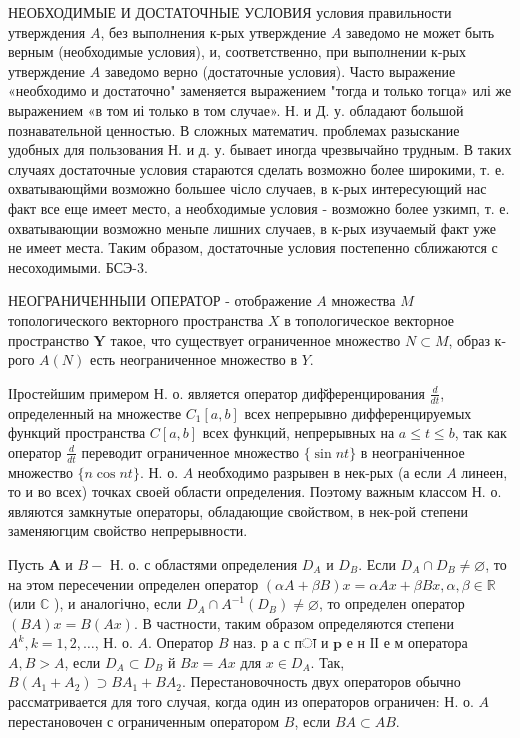 \documentclass[10pt]{article}
\begin{document}
НЕОБХОДИМЫЕ И ДОСТАТОЧНЫЕ УСЛОВИЯ условия правильности утверждения $A$, без выполнения к-рых утверждение $A$ заведомо не может быть верным (необходимые условия), и, соответственно, при выполнении к-рых утверждение $A$ заведомо верно (достаточные условия). Часто выражение «необходимо и достаточно" заменяется выражением "тогда и только тогца» илі же выражением «в том иі только в том случае». Н. и Д. у. обладают большой познавательной ценностью. В сложных математич. проблемах разыскание удобных для пользования Н. и д. у. бывает иногда чрезвычайно трудным. В таких случаях достаточные условия стараются сделать возможно более широкими, т. е. охватывающйми возможно большее чісло случаев, в к-рых интересующий нас факт все еще имеет место, а необходимые условия - возможно более узкимп, т. е. охватывающии возможно меньпе лишних случаев, в к-рых изучаемый факт уже не имеет места. Таким образом, достаточные условия постепенно сближаются с несоходимыми. БСЭ-3.



НЕОГРАНИЧЕННЫІИ ОПЕРАТОР - отображение $A$ множества $M$ топологического векторного пространства $X$ в топологическое векторное пространство $\boldsymbol{Y}$ такое, что существует ограниченное множество $N \subset M$, образ к-рого $A(N)$ есть неограниченное множество в $Y$.



ІІростейшим примером Н. о. является оператор диф̆ференцирования $\frac{d}{d t}$, определенный на множестве $C_{1}[a, b]$ всех непрерывно дифференцируемых функций пространства $C[a, b]$ всех функций, непрерывных на $a \leqslant t \leqslant b$, так как оператор $\frac{d}{d t}$ переводит ограниченное множество $\{\sin n t\}$ в неограніченное множество $\{n \cos n t\}$. Н. о. $A$ необходимо разрывен в нек-рых (а если $A$ линеен, то и во всех) точках своей области определения. Поэтому важным классом Н. о. являются замкнутые операторы, обладающие свойством, в нек-рой степени заменяюгцим свойство непрерывности.



Пусть $\boldsymbol{A}$ и $B-$ Н. о. с областями определения $D_{A}$ и $D_{B}$. Если $D_{A} \cap D_{B} \neq \varnothing$, то на этом пересечении определен оператор $(\alpha A+\beta B) x=\alpha A x+\beta B x, \alpha, \beta \in \mathbb{R}$ (или $\mathbb{C}$ ), и аналогічно, если $D_{A} \cap A^{-1}\left(D_{B}\right) \neq \varnothing$, то определен оператор $(B A) x=B(A x)$. В частности, таким образом определяются степени $A^{k}, k=1,2, \ldots$, Н. о. $A$. Оператор $B$ наз. р а с пा и $\mathbf{p}$ е н ІІ е м оператора $A, B>A$, если $D_{A} \subset D_{B}$ й $B x=A x$ для $x \in D_{A}$. Так, $B\left(A_{1}+A_{2}\right) \supset B A_{1}+B A_{2}$. Перестановочность двух операторов обычно рассматривается для того случая, когда один из операторов ограничен: Н. о. $A$ перестановочен с ограниченным оператором $B$, если $B A \subset A B$.
\end{document}
